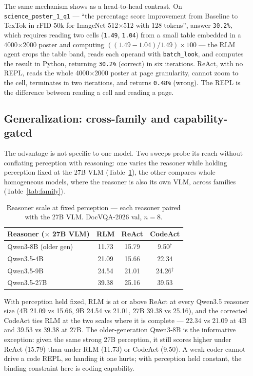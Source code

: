 The same mechanism shows as a head-to-head contrast. On \texttt{science\_poster\_1\_q1} --- ``the percentage score improvement from Baseline to TexTok in rFID-50k for ImageNet 512$\times$512 with 128 tokens'', answer \texttt{30.2\%}, which requires reading two cells (\texttt{1.49}, \texttt{1.04}) from a small table embedded in a 4000$\times$2000 poster and computing $((1.49-1.04)/1.49)\times100$ --- the RLM agent crops the table band, reads each operand with \texttt{batch\_look}, and computes the result in Python, returning \texttt{30.2\%} (correct) in six iterations. ReAct, with no REPL, reads the whole 4000$\times$2000 poster at page granularity, cannot zoom to the cell, terminates in two iterations, and returns \texttt{0.48\%} (wrong). The REPL is the difference between reading a cell and reading a page.

\subsection{Generalization: cross-family and capability-gated}

The advantage is not specific to one model. Two sweeps probe its reach without conflating perception with reasoning: one varies the reasoner while holding perception fixed at the 27B VLM (Table~\ref{tab:scale}), the other compares whole homogeneous models, where the reasoner is also its own VLM, across families (Table~\ref{tab:family}).

\begin{table}[t]
\centering
\small
\begin{tabular}{lccc}
\toprule
Reasoner ($\times$ 27B VLM) & RLM & ReAct & CodeAct \\
\midrule
Qwen3-8B (older gen) & 11.73 & 15.79 & 9.50$^\dag$ \\
Qwen3.5-4B & 21.09 & 15.66 & 22.34 \\
Qwen3.5-9B & 24.54 & 21.01 & 24.26$^\dag$ \\
Qwen3.5-27B & 39.38 & 25.16 & 39.53 \\
\bottomrule
\end{tabular}
\caption{Reasoner scale at fixed perception --- each reasoner paired with the 27B VLM. DocVQA-2026 val, $n{=}8$.}
\label{tab:scale}
\end{table}

With perception held fixed, RLM is at or above ReAct at every Qwen3.5 reasoner size (4B 21.09 vs 15.66, 9B 24.54 vs 21.01, 27B 39.38 vs 25.16), and the corrected CodeAct ties RLM at the two scales where it is complete --- 22.34 vs 21.09 at 4B and 39.53 vs 39.38 at 27B. The older-generation Qwen3-8B is the informative exception: given the same strong 27B perception, it still scores higher under ReAct (15.79) than under RLM (11.73) or CodeAct (9.50). A weak coder cannot drive a code REPL, so handing it one hurts; with perception held constant, the binding constraint here is coding capability.

